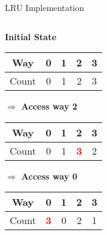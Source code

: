\documentclass[aspectratio=169,12pt]{beamer}
\begin{document}
\begin{frame}[fragile]{LRU Implementation}
\begin{columns}[T]
\begin{column}{0.30\textwidth}
\small
\raggedright
\textbf{Initial State}\\
\vspace{0.1cm}
\begin{tabular}{|c|c|c|c|c|}
\hline
Way & 0 & 1 & 2 & 3 \\
\hline
Count & 0 & 1 & 2 & 3 \\
\hline
\end{tabular}

\vspace{0.4cm}
\textbf{$\Rightarrow$ Access way 2}\\
\vspace{0.1cm}
\begin{tabular}{|c|c|c|c|c|}
\hline
Way & 0 & 1 & 2 & 3 \\
\hline
Count & 0 & 1 & \textcolor{red}{\textbf{3}} & 2 \\
\hline
\end{tabular}

\vspace{0.4cm}
\textbf{$\Rightarrow$ Access way 0}\\
\vspace{0.1cm}
\begin{tabular}{|c|c|c|c|c|}
\hline
Way & 0 & 1 & 2 & 3 \\
\hline
Count & \textcolor{red}{\textbf{3}} & 0 & 2 & 1 \\
\hline
\end{tabular}
\end{column}
\end{columns}
\end{frame}
\end{document}
